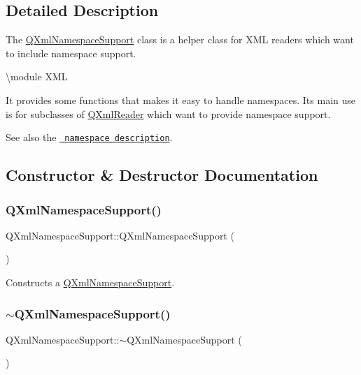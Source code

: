 \subsection{Detailed Description}
The \mbox{\hyperlink{class_q_xml_namespace_support}{Q\+Xml\+Namespace\+Support}} class is a helper class for X\+ML readers which want to include namespace support. 

\textbackslash{}module X\+ML

It provides some functions that makes it easy to handle namespaces. Its main use is for subclasses of \mbox{\hyperlink{class_q_xml_reader}{Q\+Xml\+Reader}} which want to provide namespace support.

See also the \href{xml-sax.html\#namespaces}{\texttt{ namespace description}}. 

\subsection{Constructor \& Destructor Documentation}
\mbox{\label{class_q_xml_namespace_support_a8d2d913ace7a2f2d40cf625ac08c033c}} 
\subsubsection{\texorpdfstring{QXmlNamespaceSupport()}{QXmlNamespaceSupport()}}
{\footnotesize\ttfamily Q\+Xml\+Namespace\+Support\+::\+Q\+Xml\+Namespace\+Support (\begin{DoxyParamCaption}{ }\end{DoxyParamCaption})}

Constructs a \mbox{\hyperlink{class_q_xml_namespace_support}{Q\+Xml\+Namespace\+Support}}. \mbox{\label{class_q_xml_namespace_support_ad05d7bc400ce90e5efca49a51f8c4372}} 
\subsubsection{\texorpdfstring{$\sim$QXmlNamespaceSupport()}{~QXmlNamespaceSupport()}}
{\footnotesize\ttfamily Q\+Xml\+Namespace\+Support\+::$\sim$\+Q\+Xml\+Namespace\+Support (\begin{DoxyParamCaption}{ }\end{DoxyParamCaption})}

